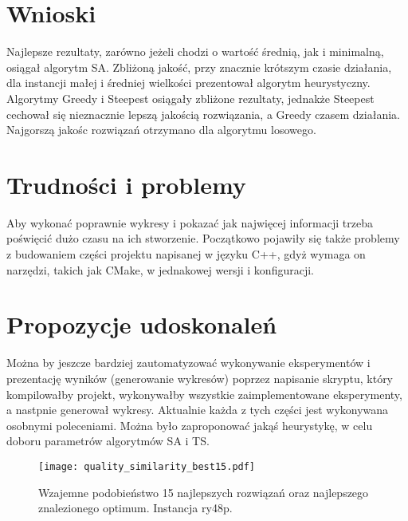 \documentclass{article}
\begin{document}
\section{Wnioski}


Najlepsze rezultaty, zarówno jeżeli chodzi o wartość średnią, jak i minimalną, osiągał algorytm SA. Zbliżoną jakość, przy znacznie krótszym czasie działania, dla instancji małej i średniej wielkości prezentował algorytm heurystyczny. Algorytmy Greedy i Steepest osiągały zbliżone rezultaty, jednakże Steepest cechował się nieznacznie lepszą jakością rozwiązania, a Greedy czasem działania.
Najgorszą jakośc rozwiązań otrzymano dla algorytmu losowego.

\section{Trudności i problemy}

Aby wykonać poprawnie wykresy i pokazać jak najwięcej informacji trzeba poświęcić dużo czasu na ich stworzenie. Początkowo pojawiły się także problemy z budowaniem części projektu napisanej w języku C++, gdyż wymaga on narzędzi, takich jak CMake, w jednakowej wersji i konfiguracji.

\section{Propozycje udoskonaleń}

Można by jeszcze bardziej zautomatyzować wykonywanie eksperymentów i prezentację wyników (generowanie wykresów) poprzez napisanie skryptu, który kompilowałby projekt, wykonywałby wszystkie zaimplementowane eksperymenty, a nastpnie generował wykresy. Aktualnie każda z tych części jest wykonywana osobnymi poleceniami. Można było zaproponować jakąś heurystykę, w celu doboru parametrów algorytmów SA i TS.

\begin{figure}[H]
    \begin{center}
        \texttt{[image: quality\_similarity\_best15.pdf]}
    \end{center}
    \caption{Wzajemne podobieństwo 15 najlepszych rozwiązań oraz najlepszego znalezionego optimum. Instancja ry48p.}
    \label{fig:quality_sim}
\end{figure}

\clearpage

\printbibliography
\end{document}
